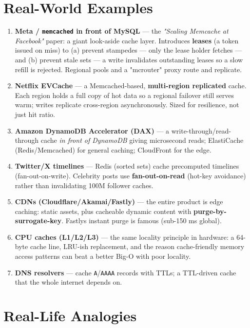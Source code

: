 \documentclass[11pt]{article}
\begin{document}
\section{Real-World Examples}\label{real-world-examples}

\begin{enumerate}
\def\labelenumi{\arabic{enumi}.}
\item
  \textbf{Meta / \texttt{memcached} in front of MySQL} --- the \emph{"Scaling Memcache at Facebook"} paper: a giant look-aside cache layer. Introduces \textbf{leases} (a token issued on miss) to (a) prevent stampedes --- only the lease holder fetches --- and (b) prevent stale sets --- a write invalidates outstanding leases so a slow refill is rejected. Regional pools and a "mcrouter" proxy route and replicate.
\item
  \textbf{Netflix EVCache} --- a Memcached-based, \textbf{multi-region replicated} cache. Each region holds a full copy of hot data so a regional failover still serves warm; writes replicate cross-region asynchronously. Sized for resilience, not just hit ratio.
\item
  \textbf{Amazon DynamoDB Accelerator (DAX)} --- a write-through/read-through cache \emph{in front of DynamoDB} giving microsecond reads; ElastiCache (Redis/Memcached) for general caching; CloudFront for the edge.
\item
  \textbf{Twitter/X timelines} --- Redis (sorted sets) cache precomputed timelines (fan-out-on-write). Celebrity posts use \textbf{fan-out-on-read} (hot-key avoidance) rather than invalidating 100M follower caches.
\item
  \textbf{CDNs (Cloudflare/Akamai/Fastly)} --- the entire product is edge caching: static assets, plus cacheable dynamic content with \textbf{purge-by-surrogate-key}. Fastly\textquotesingle s instant purge is famous (sub-150 ms global).
\item
  \textbf{CPU caches (L1/L2/L3)} --- the same locality principle in hardware: a 64-byte cache line, LRU-ish replacement, and the reason cache-friendly memory access patterns can beat a better Big-O with poor locality.
\item
  \textbf{DNS resolvers} --- cache \texttt{A}/\texttt{AAAA} records with TTLs; a TTL-driven cache that the whole internet depends on.
\end{enumerate}

\section{Real-Life Analogies}\label{real-life-analogies}
\end{document}
